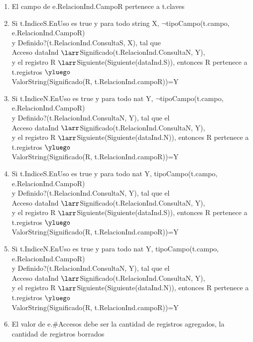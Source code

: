 \begin{enumerate}
\item El campo de e.RelacionInd.CampoR pertenece a t.claves
\item Si t.IndiceS.EnUso es true y para todo string X, $\neg$tipoCampo(t.campo, e.RelacionInd.CampoR) \\y 
Definido?(t.RelacionInd.ConsultaS, X), tal que \\Acceso dataInd $\larr$Significado(t.RelacionInd.ConsultaN, Y), \\
y el registro R $\larr$Siguiente(Siguiente(dataInd.S)), entonces R pertenece a t.registros $\yluego$ \\
ValorString(Significado(R, t.RelacionInd.campoR))=Y
\item Si t.IndiceN.EnUso es true y para todo nat Y, $\neg$tipoCampo(t.campo, e.RelacionInd.CampoR) \\y Definido?(t.RelacionInd.ConsultaN, Y), tal que el
\\Acceso dataInd $\larr$Significado(t.RelacionInd.ConsultaN, Y), \\
y el registro R $\larr$Siguiente(Siguiente(dataInd.N)), entonces R pertenece a t.registros $\yluego$ \\
ValorString(Significado(R, t.RelacionInd.campoR))=Y
\item Si t.IndiceS.EnUso es true y para todo nat Y, tipoCampo(t.campo, e.RelacionInd.CampoR) \\y Definido?(t.RelacionInd.ConsultaN, Y), tal que el\\
 Acceso dataInd $\larr$Significado(t.RelacionInd.ConsultaN, Y), \\
 y el registro R $\larr$Siguiente(Siguiente(dataInd.S)), entonces R pertenece a t.registros $\yluego$ \\
 ValorString(Significado(R, t.RelacionInd.campoR))=Y
\item Si t.IndiceN.EnUso es true y para todo nat Y, tipoCampo(t.campo, e.RelacionInd.CampoR) \\y Definido?(t.RelacionInd.ConsultaN, Y), tal que el\\
 Acceso dataInd $\larr$Significado(t.RelacionInd.ConsultaN, Y), \\
 y el registro R $\larr$Siguiente(Siguiente(dataInd.N)), entonces R pertenece a t.registros $\yluego$ \\
 ValorString(Significado(R, t.RelacionInd.campoR))=Y

\item El valor de e.\#Accesos debe ser la cantidad de registros agregados, la cantidad de registros borrados
\end{enumerate}

